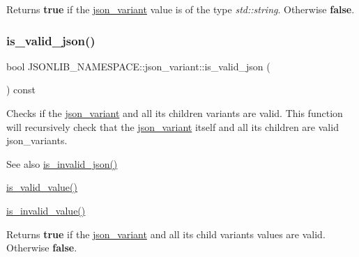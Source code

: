 \begin{DoxyReturn}{Returns}
{\bfseries true} if the \hyperlink{classJSONLIB__NAMESPACE_1_1json__variant}{json\+\_\+variant} value is of the type {\itshape std\+::string}. Otherwise {\bfseries false}. 
\end{DoxyReturn}
\mbox{\label{classJSONLIB__NAMESPACE_1_1json__variant_a158e3148d9256af3d1b8251b2ca7b6c4}} 
\subsubsection{\texorpdfstring{is\+\_\+valid\+\_\+json()}{is\_valid\_json()}\hspace{0.1cm}{\footnotesize\ttfamily [1/2]}}
{\footnotesize\ttfamily bool J\+S\+O\+N\+L\+I\+B\+\_\+\+N\+A\+M\+E\+S\+P\+A\+C\+E\+::json\+\_\+variant\+::is\+\_\+valid\+\_\+json (\begin{DoxyParamCaption}{ }\end{DoxyParamCaption}) const}



Checks if the \hyperlink{classJSONLIB__NAMESPACE_1_1json__variant}{json\+\_\+variant} and all its children variants are valid. This function will recursively check that the \hyperlink{classJSONLIB__NAMESPACE_1_1json__variant}{json\+\_\+variant} itself and all its children are valid json\+\_\+variants. 

\begin{DoxySeeAlso}{See also}
\hyperlink{classJSONLIB__NAMESPACE_1_1json__variant_a1a08b35da4cf3a334d32ebb81b20c08a}{is\+\_\+invalid\+\_\+json()} 

\hyperlink{classJSONLIB__NAMESPACE_1_1json__variant_a224aab2dd56e3928dd893be8b7f3367a}{is\+\_\+valid\+\_\+value()} 

\hyperlink{classJSONLIB__NAMESPACE_1_1json__variant_ab6552a5e3de90ab1fbca078e5c245bfb}{is\+\_\+invalid\+\_\+value()} 
\end{DoxySeeAlso}
\begin{DoxyReturn}{Returns}
{\bfseries true} if the \hyperlink{classJSONLIB__NAMESPACE_1_1json__variant}{json\+\_\+variant} and all its child variants values are valid. Otherwise {\bfseries false}. 
\end{DoxyReturn}
\mbox{\label{classJSONLIB__NAMESPACE_1_1json__variant_a158e3148d9256af3d1b8251b2ca7b6c4}} 
